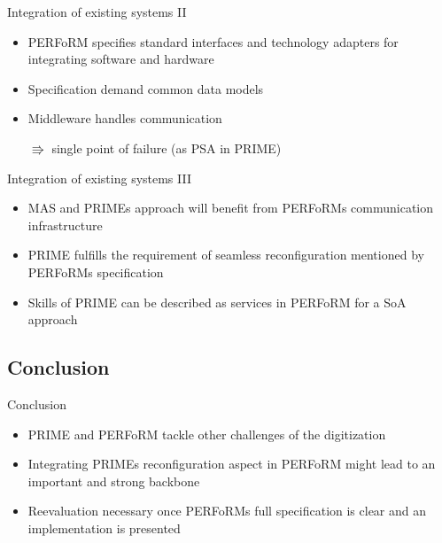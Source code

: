 \documentclass[12pt]{beamer}
\begin{document}
\begin{frame}{Integration of existing systems II}
	\begin{itemize}
		\item PERFoRM specifies standard interfaces and technology adapters for integrating software and hardware
		\newline
		
		\item Specification demand common data models
		\newline
		
		\item Middleware handles communication
		\newline
		
		$\Rrightarrow$ single point of failure (as PSA in PRIME)
	\end{itemize}
\end{frame}

\begin{frame}{Integration of existing systems III}
	\begin{itemize}
		\item MAS and PRIMEs approach will benefit from PERFoRMs communication infrastructure
		\newline
		
		\item PRIME fulfills the requirement of seamless reconfiguration mentioned by PERFoRMs specification
		\newline
		
		\item Skills of PRIME can be described as services in PERFoRM for a SoA approach
		\newline
		
	\end{itemize}
\end{frame}

\subsection{Conclusion}

\begin{frame}{Conclusion}
	\begin{itemize}
		\item PRIME and PERFoRM tackle other challenges of the digitization
		\newline
		
		\item Integrating PRIMEs reconfiguration aspect in PERFoRM might lead to an important and strong backbone
		\newline
		
		\item Reevaluation necessary once PERFoRMs full specification is clear and an implementation is presented
		\newline
		
	\end{itemize}
\end{frame}
\end{document}
